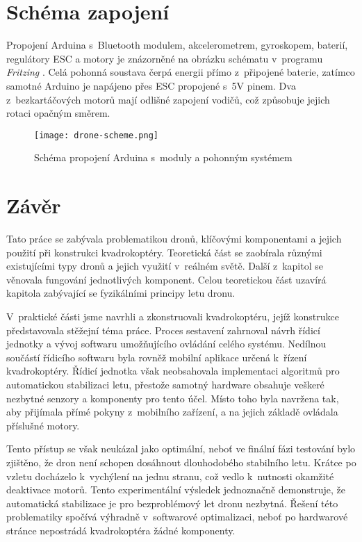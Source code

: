 \documentclass[12pt]{report}
\begin{document}
\chapter[Schéma zapojení]{Schéma zapojení}
Propojení Arduina s~Bluetooth modulem, akcelerometrem, gyroskopem, baterií, regulátory ESC a motory je znázorněné na obrázku schématu v~programu \textit{Fritzing} \cite{fritzing}. Celá pohonná soustava čerpá energii přímo z~připojené baterie, zatímco samotné Arduino je napájeno přes ESC propojené s~5V pinem. Dva z~bezkartáčových motorů mají odlišné zapojení vodičů, což způsobuje jejich rotaci opačným směrem.

\vspace{40pt}
\begin{figure}[H]
	\centering
	\texttt{[image: drone-scheme.png]}
	\caption{Schéma propojení Arduina s~moduly a pohonným systémem \cite{fritzing}}
	\label{fig:drone-scheme.png}
\end{figure}

\chapter*{Závěr}
	
Tato práce se zabývala problematikou dronů, klíčovými komponentami a jejich použití při konstrukci kvadrokoptéry. Teoretická část se zaobírala různými existujícími typy dronů a jejich využití v~reálném světě. Další z~kapitol se věnovala fungování jednotlivých komponent. Celou teoretickou část uzavírá kapitola zabývající se fyzikálními principy letu dronu.

V~praktické části jsme navrhli a zkonstruovali kvadrokoptéru, jejíž konstrukce představovala stěžejní téma práce. Proces sestavení zahrnoval návrh řídicí jednotky a vývoj softwaru umožňujícího ovládání celého systému. Nedílnou součástí řídicího softwaru byla rovněž mobilní aplikace určená k~řízení kvadrokoptéry. Řídicí jednotka však neobsahovala implementaci algoritmů pro automatickou stabilizaci letu, přestože samotný hardware obsahuje veškeré nezbytné senzory a komponenty pro tento účel. Místo toho byla navržena tak, aby přijímala přímé pokyny z~mobilního zařízení, a na jejich základě ovládala příslušné motory.

Tento přístup se však neukázal jako optimální, neboť ve finální fázi testování bylo zjištěno, že dron není schopen dosáhnout dlouhodobého stabilního letu. Krátce po vzletu docházelo k~vychýlení na jednu stranu, což vedlo k~nutnosti okamžité deaktivace motorů. Tento experimentální výsledek jednoznačně demonstruje, že automatická stabilizace je pro bezproblémový let dronu nezbytná. Řešení této problematiky spočívá výhradně v~softwarové optimalizaci, neboť po hardwarové stránce nepostrádá kvadrokoptéra žádné komponenty.
\end{document}
